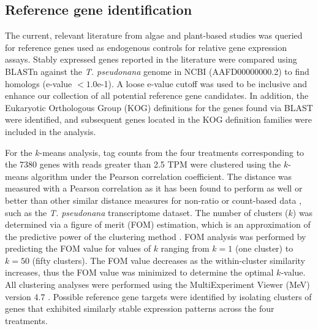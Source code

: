\subsection{Reference gene identification}
\par The current, relevant literature from algae and plant-based studies was queried for reference genes used as endogenous controls for relative gene expression assays. Stably expressed genes reported in the literature were compared using BLASTn \citep{Altschul1997} against the \textit{T. pseudonana} genome in NCBI (AAFD00000000.2) to find homologs (e-value $< 1.0$e-1). A loose e-value cutoff was used to be inclusive and enhance our collection of all potential reference gene candidates. In addition, the Eukaryotic Orthologous Group (KOG) definitions for the genes found via BLAST were identified, and subsequent genes located in the KOG definition families were included in the analysis.\par 
For the $k$-means analysis, tag counts from the four treatments corresponding to the 7380 genes with reads greater than 2.5 TPM were clustered using the $k$-means algorithm under the Pearson correlation coefficient. The distance was measured with a Pearson correlation as it has been found to perform as well or better than other similar distance measures for non-ratio or count-based data \citep{Gibbons2002}, such as the \textit{T. pseudonana} transcriptome dataset. The number of clusters ($k$) was determined via a figure of merit (FOM) estimation, which is an approximation of the predictive power of the clustering method \citep{Yeung2001}. FOM analysis was performed by predicting the FOM value for values of $k$ ranging from $k=1$ (one cluster) to $k=50$ (fifty clusters). The FOM value decreases as the within-cluster similarity increases, thus the FOM value was minimized to determine the optimal $k$-value. All clustering analyses were performed using the MultiExperiment Viewer (MeV) version 4.7 \citep{Saeed2003, Saeed2006}. Possible reference gene targets were identified by isolating clusters of genes that exhibited similarly stable expression patterns across the four treatments. \par
